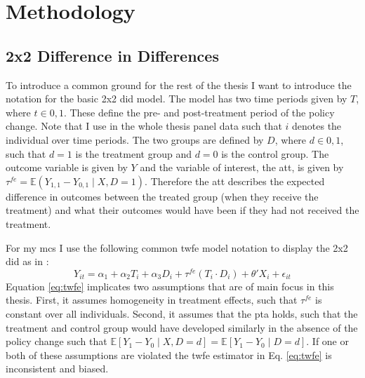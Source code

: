 \section{Methodology}




\subsection{2x2 Difference in Differences}
To introduce a common ground for the rest of the thesis I want to introduce the notation for the basic 2x2 \ac{did} model.
The model has two time periods given by $T$, where $t \in 0, 1$. These define the pre- and post-treatment period of the policy change.
Note that I use in the whole thesis panel data such that $i$ denotes the individual over time periods.
The two groups are defined by $D$, where $d \in 0, 1$, such that $d = 1$ is the treatment group and $d = 0$ is the control group.
The outcome variable is given by $Y$ and the variable of interest, the \ac{att}, is given by $\tau^{fe} = \mathbb{E}(Y_{1,1} - Y_{0,1} \mid  X,D = 1)$.
Therefore the \ac{att} describes the expected difference in outcomes between the treated group (when they receive the treatment) and what their outcomes would have been if they had not received the treatment.

For my \ac{mcs} I use the following common \ac{twfe} model notation to display the 2x2 \ac{did} as in \citet{santannaDoublyRobustDifferenceindifferences2020}:
\begin{equation}
Y_{it} = \alpha_1 + \alpha_2 T_i + \alpha_3 D_i + \tau^{fe} (T_i \cdot D_i) + \theta' X_i + \epsilon_{it}
\label{eq:twfe}
\end{equation}
Equation \ref{eq:twfe} implicates two assumptions that are of main focus in this thesis.
First, it assumes homogeneity in treatment effects, such that $\tau^{fe}$ is constant over all individuals.
Second, it assumes that the \ac{pta} holds, such that the treatment and control group would have developed similarly in the absence of the policy change such that $\mathbb{E} [Y_1 - Y_0 \mid X, D = d] = \mathbb{E} [Y_1 - Y_0 \mid D = d]$.
If one or both of these assumptions are violated the \ac{twfe} estimator in Eq. \ref{eq:twfe} is inconsistent and biased.

